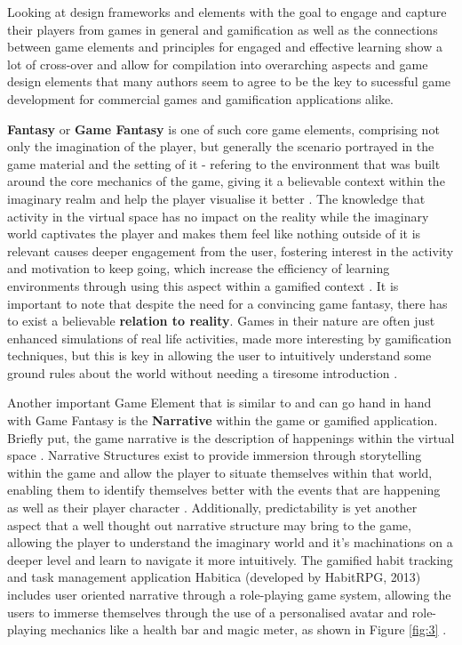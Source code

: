 Looking at design frameworks and elements with the goal to engage and capture their players from games in general and gamification as well as the connections between game elements and principles for engaged and effective learning show a lot of cross-over and allow for compilation into overarching aspects and game design elements that many authors seem to agree to be the key to sucessful game development for commercial games and gamification applications alike.

\textbf{Fantasy} or \textbf{Game Fantasy} is one of such core game elements, comprising not only the imagination of the player, but generally the scenario portrayed in the game material and the setting of it - refering to the environment that was built around the core mechanics of the game, giving it a believable context within the imaginary realm and help the player visualise it better \cite{aspects} \cite{model}. The knowledge that activity in the virtual space has no impact on the reality while the imaginary world captivates the player and makes them feel like nothing outside of it is relevant causes deeper engagement from the user, fostering interest in the activity and motivation to keep going, which increase the efficiency of learning environments through using this aspect within a gamified context \cite{aspects}.
It is important to note that despite the need for a convincing game fantasy, there has to exist a believable \textbf{relation to reality}. Games in their nature are often just enhanced simulations of real life activities, made more interesting by gamification techniques, but this is key in allowing the user to intuitively understand some ground rules about the world without needing a tiresome introduction \cite{lifelong} \cite{fail}.

Another important Game Element that is similar to and can go hand in hand with Game Fantasy is the \textbf{Narrative} within the game or gamified application. Briefly put, the game narrative is the description of happenings within the virtual space \cite{model}. Narrative Structures exist to provide immersion through storytelling within the game and allow the player to situate themselves within that world, enabling them to identify themselves better with the events that are happening as well as their player character \cite{lifelong}. Additionally, predictability is yet another aspect that a well thought out narrative structure may bring to the game, allowing the player to understand the imaginary world and it's machinations on a deeper level and learn to navigate it more intuitively. The gamified habit tracking and task management application Habitica (developed by HabitRPG, 2013) includes user oriented narrative through a role-playing game system, allowing the users to immerse themselves through the use of a personalised avatar and role-playing mechanics like a health bar and magic meter, as shown in Figure \ref{fig:3} \cite{avatar}.

